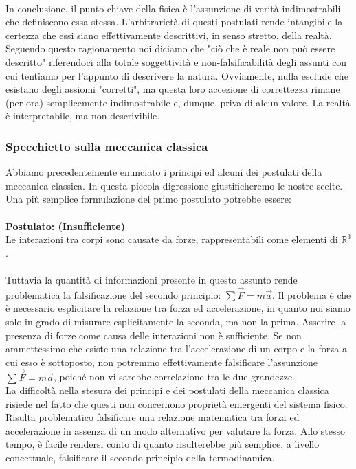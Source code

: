 \documentclass[]{article}
\begin{document}
	\\
	In conclusione, il punto chiave della fisica è l'assunzione di verità indimostrabili che definiscono essa stessa. L'arbitrarietà di questi postulati rende intangibile la certezza che essi siano effettivamente descrittivi, in senso stretto, della realtà. Seguendo questo ragionamento noi diciamo che "ciò che è reale non può essere descritto" riferendoci alla totale soggettività e non-falsificabilità degli assunti con cui tentiamo per l'appunto di descrivere la natura. Ovviamente, nulla esclude che esistano degli assiomi "corretti", ma questa loro accezione di correttezza rimane (per ora) semplicemente indimostrabile e, dunque, priva di alcun valore. La realtà è interpretabile, ma non descrivibile.
	
	\subsubsection{Specchietto sulla meccanica classica}
	Abbiamo precedentemente enunciato i principi ed alcuni dei postulati della meccanica classica. In questa piccola digressione giustificheremo le nostre scelte. Una più semplice formulazione del primo postulato potrebbe essere:\\\\
	\textbf{Postulato: (Insufficiente)}\\
		Le interazioni tra corpi sono causate da forze, rappresentabili come elementi di $\mathbb{R}^3$.
	\\\\
	Tuttavia la quantità di informazioni presente in questo assunto rende problematica la falsificazione del secondo principio: $\sum\vec{F}=m\vec{a}$. Il problema è che è necessario esplicitare la relazione tra forza ed accelerazione, in quanto noi siamo solo in grado di misurare esplicitamente la seconda, ma non la prima. Asserire la presenza di forze come causa delle interazioni non è sufficiente. Se non ammettessimo che esiste	una relazione tra l'accelerazione di un corpo e la forza a cui esso è sottoposto, non potremmo effettivamente falsificare l'assunzione $\sum\vec{F}=m\vec{a}$, poiché non vi sarebbe correlazione tra le due grandezze.\\
	La difficoltà nella stesura dei principi e dei postulati della meccanica classica risiede nel fatto che questi non concernono proprietà emergenti del sistema fisico. Risulta problematico falsificare una relazione matematica tra forza ed accelerazione in assenza di un modo alternativo per valutare la forza. Allo stesso tempo, è facile rendersi conto di quanto risulterebbe più semplice, a livello concettuale, falsificare il secondo principio della termodinamica.\\
\end{document}
